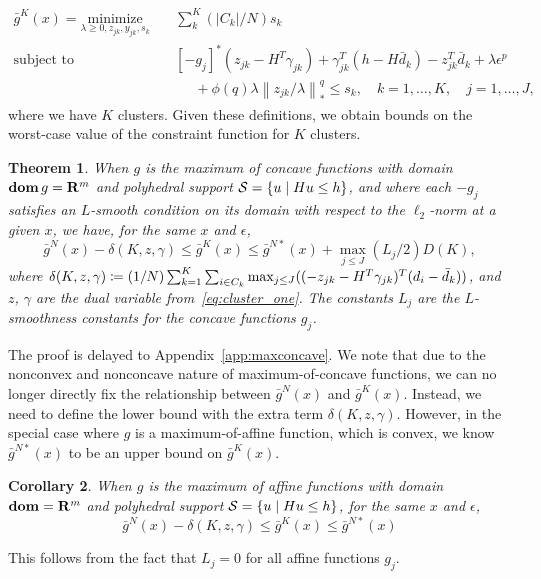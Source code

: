 \documentclass[12pt]{article}
\theoremstyle{thmstyleone}%
\newtheorem{theorem}{Theorem}%
\newtheorem{corollary}[theorem]{Corollary}%
\theoremstyle{thmstyletwo}%
\theoremstyle{thmstylethree}%
\begin{document}
{\begin{equation}
	\tag{MRO-K-Dual}
	\label{eq:cluster_dual}
	\begin{aligned}
		\bar{g}^K(x) = \underset{\lambda \geq 0, z_{jk},y_{jk}, s_k}{\text{minimize}} &\quad \sum_k^K  (|C_k|/N) s_k\\
	\mbox{subject to} & \quad [-g_j]^*(z_{jk} - H^T\gamma_{jk})+ \gamma_{jk}^T(h-H\bar{d}_k) - z_{jk}^T\bar{d}_k + \lambda \epsilon^p   \\
	& \hspace{1cm} + \phi(q)\lambda \left\|z_{jk}/\lambda \right\|^q_*\le s_k, \quad k = 1,\dots,K, \quad j = 1,\dots,J,
\end{aligned}
\end{equation}
where we have $K$ clusters.
Given these definitions, we obtain bounds on the worst-case value of the constraint function for $K$ clusters.
\begin{theorem}
	\label{thm:maxconcave}
	When $g$ is the maximum of concave functions with domain ${\mathop{\bf dom}{g}= {\mathbf R}^m}$ and polyhedral support $\mathcal{S} = \{u \mid Hu\leq h\}$, and where each $-g_j$ satisfies an $L$-smooth condition on its domain with respect to the $\ell_2$-norm at a given $x$, we have, for the same $x$ and $\epsilon$,
	\begin{equation*}
		\bar{g}^{N}(x) -\delta(K,z,\gamma) \leq \bar{g}^K(x) \leq  \bar{g}^{N*}(x) + \max_{j\leq J} (L_j/2)D(K),
	\end{equation*}
	where $\delta(K,z,\gamma) \coloneqq (1/N)\sum_{k=1}^K \sum_{i \in C_k}  \max_{j\leq J}((-z_{jk} -H^T\gamma_{jk})^T(d_i - \bar{d}_k))$, and $z$, $\gamma$ are the dual variable from~\eqref{eq:cluster_one}. The constants $L_j$ are the $L$-smoothness constants for the concave functions $g_j$.
	\end{theorem}
	The proof is delayed to Appendix~\ref{app:maxconcave}. We note that due to the nonconvex and nonconcave nature of maximum-of-concave functions, we can no longer directly fix the relationship between $\bar{g}^{N}(x)$ and $\bar{g}^{K}(x)$. Instead, we need to define the lower bound with the extra term $\delta(K,z,\gamma)$.
	However, in the special case where $g$ is a maximum-of-affine function, which is convex, we know $\bar{g}^{N*}(x)$ to be an upper bound on $\bar{g}^{K}(x)$.
	\begin{corollary}
		\label{cor:maxaffine}
		When $g$ is the maximum of affine functions with domain $\mathop{\bf dom} = {\mathbf R}^m$ and polyhedral support $\mathcal{S} = \{u \mid Hu\leq h\}$, for the same $x$ and $\epsilon$,
		\begin{equation*}
			\bar{g}^{N}(x) -\delta(K,z,\gamma)  \leq \bar{g}^K(x) \leq \bar{g}^{N*}(x) 
		\end{equation*}
	\end{corollary}
This follows from the fact that $L_j = 0$ for all affine functions $g_j$.}
\end{document}
